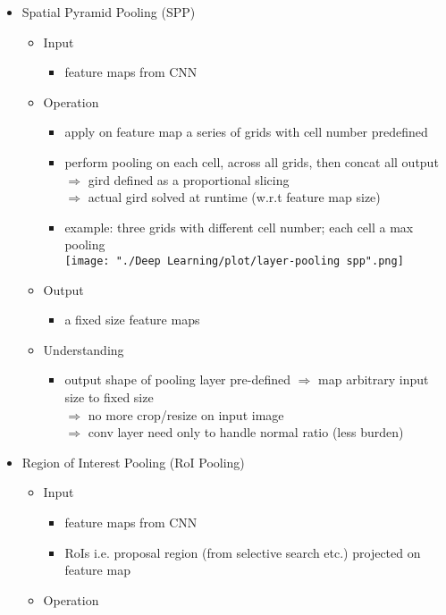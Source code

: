 \begin{itemize}
\item Spatial Pyramid Pooling (SPP)
	\begin{itemize}
	\item Input
		\begin{itemize}
		\item feature maps from CNN
		\end{itemize}
	\item Operation
		\begin{itemize}
		\item apply on feature map a series of grids with cell number predefined
		\item perform pooling on each cell, across all grids, then concat all output \\
		$\Rightarrow$ gird defined as a proportional slicing \\
		$\Rightarrow$ actual gird solved at runtime (w.r.t feature map size)
		\item example: three grids with different cell number; each cell a max pooling \\
		\texttt{[image: "./Deep Learning/plot/layer-pooling spp".png]}
		\end{itemize}
	\item Output
		\begin{itemize}
		\item a fixed size feature maps
		\end{itemize}
	\item Understanding
		\begin{itemize}
		\item output shape of pooling layer pre-defined $\Rightarrow$ map arbitrary input size to fixed size \\
		$\Rightarrow$ no more crop/resize on input image \\
		$\Rightarrow$ conv layer need only to handle normal ratio (less burden)
		\end{itemize}
	\end{itemize}
\item Region of Interest Pooling (RoI Pooling)
	\begin{itemize}
	\item Input
		\begin{itemize}
		\item feature maps from CNN
		\item RoIs i.e. proposal region (from selective search etc.) projected on feature map
		\end{itemize}
	\item Operation

\end{itemize}
\end{itemize}
